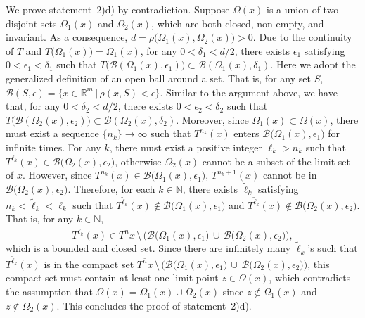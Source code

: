 \documentclass[10pt]{svmult}
\begin{document}
We prove statement~2)d) by contradiction. Suppose $\Omega(x)$ is a union of two disjoint sets $\Omega_1(x)$ and $\Omega_2(x)$, which are both closed, non-empty, and invariant. As a consequence, $d = \rho\big(\Omega_1(x),\Omega_2(x)\big)>0$. Due to the continuity of $T$ and $T\big( \Omega_1(x) \big)=\Omega_1(x)$, for any $0<\delta_1<d/2$, there exists $\epsilon_1$ satisfying $0<\epsilon_1<\delta_1$ such that $T\big( \mathcal{B}( \Omega_1(x),\epsilon_1 ) \big)\subset \mathcal{B}(\Omega_1(x),\delta_1)$. Here we adopt the generalized definition of an open ball around a set. That is, for any set $S$, $\mathcal{B}(S,\epsilon)=\{x\in \mathbb{R}^m\,|\,\rho(x,S)<\epsilon\}$. Similar to the argument above, we have that, for any $0<\delta_2<d/2$, there exists $0<\epsilon_2<\delta_2$ such that $T\big( \mathcal{B}(\Omega_2(x),\epsilon_2) \big)\subset \mathcal{B}(\Omega_2(x),\delta_2)$. Moreover, since $\Omega_1(x)\subset \Omega(x)$, there must exist a sequence $\{n_k\}\to \infty$ such that $T^{n_k}(x)$ enters $\mathcal{B}\big( \Omega_1(x),\epsilon_1 \big)$ for infinite times. For any $k$, there must exist a positive integer $\ell_k>n_k$ such that $T^{\ell_k}(x)\in \mathcal{B}\big( \Omega_2(x),\epsilon_2 \big)$, otherwise $\Omega_2(x)$ cannot be a subset of the limit set of $x$. However, since $T^{n_k}(x)\in \mathcal{B}\big( \Omega_1(x),\epsilon_1 \big)$, $T^{n_k+1}(x)$ cannot be in $\mathcal{B}\big( \Omega_2(x),\epsilon_2 \big)$. Therefore, for each $k\in \mathbb{N}$, there exists $\tilde{\ell}_k$ satisfying $n_k<\tilde{\ell}_k<\ell_k$ such that $T^{\tilde{\ell}_k}(x)\notin \mathcal{B}\big( \Omega_1(x),\epsilon_1 \big)$ and  $T^{\tilde{\ell}_k}(x)\notin \mathcal{B}\big( \Omega_2(x),\epsilon_2 \big)$. That is, for any $k\in \mathbb{N}$,
\begin{equation*}
T^{\tilde{\ell}_k}(x) \in \overline{T^n x}\,\setminus\, \Big( \mathcal{B}\big( \Omega_1(x),\epsilon_1 \big)\, \cup\, \mathcal{B}\big( \Omega_2(x),\epsilon_2 \big) \Big), 
\end{equation*} 
which is a bounded and closed set. Since there are infinitely many $\tilde{\ell}_k$'s such that $T^{\tilde{\ell}_k}(x)$ is in the compact set $\overline{T^n x}\,\setminus\, \Big( \mathcal{B}\big( \Omega_1(x),\epsilon_1 \big)\, \cup\, \mathcal{B}\big( \Omega_2(x),\epsilon_2 \big) \Big)$, this compact set must contain at least one limit point $z\in \Omega(x)$, which contradicts the assumption that $\Omega(x)=\Omega_1(x)\cup \Omega_2(x)$ since $z\notin \Omega_1(x)$ and $z\notin \Omega_2(x)$. This concludes the proof of statement~2)d).
\end{document}
